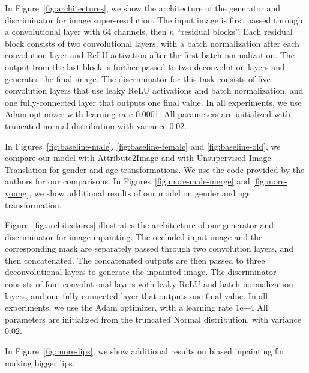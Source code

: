 \documentclass[10pt,twocolumn,letterpaper]{article}
\begin{document}
\begin{bibunit}[ieee]
\begin{appendices}
In Figure~\ref{fig:architectures}, we show the architecture of the generator and discriminator for image super-resolution.
The input image is first passed through a convolutional layer with 64 channels, then $n$ ``residual blocks''. Each residual block consists of two convolutional 
layers, with a batch normalization after each convolution layer and ReLU activation
after the first batch normalization. The output from the last block is further passed to two deconvolution layers
and generates the final image. 
The discriminator for this task consists of five convolution layers that use leaky ReLU activations and batch normalization, and one fully-connected layer that outputs one final value.
In all experiments, we use Adam optimizer with learning rate 0.0001.%
All parameters are initialized with truncated normal distribution with variance 0.02. 



In Figures~\ref{fig:baseline-male}, \ref{fig:baseline-female} and \ref{fig:baseline-old}, we compare our model with Attribute2Image  \cite{DBLP:journals/corr/YanYSL15} and with Unsupervised Image Translation \cite{DBLP:journals/corr/DongNWG17} for gender and age transformations. 
We use the code provided by the authors for our comparisons. 
In Figures~\ref{fig:more-male-merge} and \ref{fig:more-young},
we show additional results of our model on gender and age transformation.


Figure~\ref{fig:architectures} illustrates the architecture of our generator and discriminator for image inpainting.
The occluded input image and the corresponding mask are separately passed through two convolution 
layers, and then concatenated. The concatenated outputs are then passed to three deconvolutional layers  
to generate the inpainted image.  
The discriminator  consists of four convolutional layers  with leaky ReLU and batch normalization layers, and one fully connected layer that outputs one final value.  
In all experiments, we use the Adam optimizer, with a learning rate $1\mathrm{e}{-4}$%
All parameters are initialized from the truncated Normal distribution, with variance 0.02. 

In Figure~\ref{fig:more-lips}, 
we show additional results on biased inpainting for making bigger lips.


\end{appendices}
\end{bibunit}
\end{document}
